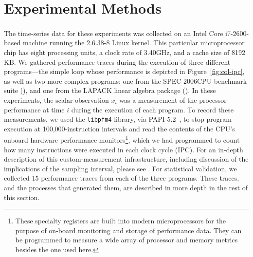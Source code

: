 \section{Experimental Methods}\label{sec:methods}



The time-series data for these experiments was collected on an Intel
Core\textsuperscript{\textregistered} i7-2600-based machine running
the 2.6.38-8 Linux kernel.  This particular microprocessor chip has
eight processing units, a clock rate of 3.40GHz, and a cache size of
8192 KB.  We gathered performance traces during the execution of three
different programs---the simple \col loop whose performance is
depicted in Figure~\ref{fig:col-ipc}, as well as two more-complex
programs: one from the SPEC 2006CPU benchmark suite (\gcc), and one
from the LAPACK linear algebra package (\svd).  In these experiments, the scalar observation $x_i$ was a measurement of the processor performance at time $i$ during the execution of each program.  To record these measurements, we used the {\tt libpfm4}
library, via PAPI
% 
% 
5.2~\cite{papi}, to stop program execution at 100,000-instruction
intervals and read the contents of the CPU's onboard hardware
performance monitors\footnote{These specialty registers are built into
  modern microprocessors for the purpose of on-board monitoring and
  storage of performance data.  They can be programmed to measure a
  wide array of processor and memory metrics besides the one used
  here.}, which we had programmed to count how many instructions were
executed in each clock cycle (IPC).  For an in-depth description of
this custom-measurement infrastructure, including discussion of the
implications of the sampling interval, please see
\cite{zach-IDA10,mytkowicz09,todd-phd}.  For statistical validation,
we collected 15 performance traces from each of the three programs.
These traces, and the processes that generated them, are described in
more depth in the rest of this section.


